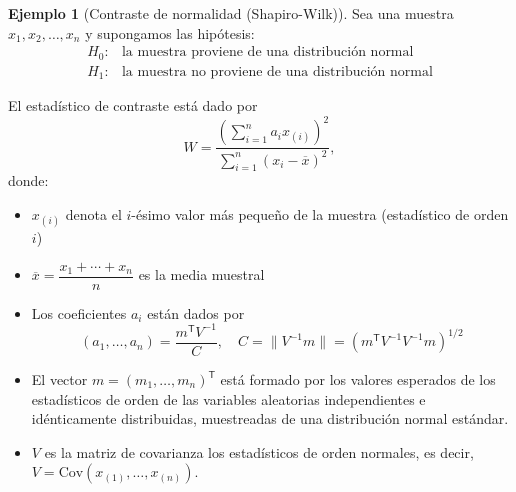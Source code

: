 \documentclass[11pt,a4paper]{book}
\theoremstyle{definition}%
\newtheorem{ejemplo}[teorema]{Ejemplo}
\begin{document}
            \begin{ejemplo}[Contraste de normalidad (Shapiro-Wilk)]
                Sea una muestra \(x_{1}, x_{2}, \ldots, x_{n}\) y supongamos las hipótesis:
                \[
                \begin{split}
                    H_{0}: &\text{la muestra proviene de una distribución normal}\\
                    H_{1}: &\text{la muestra no proviene de una distribución normal}
                \end{split}
                \]
                
                El estadístico de contraste está dado por
                    \begin{equation*}
                        W = \frac{\left( \sum_{i=1}^{n} a_i x_{(i)} \right)^{2}}{\sum_{i=1}^{n} (x_i - \overline{x})^{2}},
                    \end{equation*}
                    donde:
                    \begin{itemize}
                        \item $x_{(i)}$  denota el $i$-ésimo valor más pequeño de la muestra (estadístico de orden $i$)
                        
                        \item $\overline{x} = \dfrac{x_{1}+\cdots+x_{n}}{n}$ es la media muestral
                        
                        \item Los coeficientes $a_i$ están dados por
                        \[
                            (a_{1},\dots,a_{n}) = \frac{m^{\mathsf{T}} V^{-1}}{C}, \quad
                            C = \| V^{-1} m \| = \left( m^{\mathsf{T}} V^{-1} V^{-1} m \right)^{1/2}
                        \]
                        
                        \item El vector $m = (m_{1},\dots,m_{n})^{\mathsf{T}}$ está formado por los valores esperados de los estadísticos de orden 
                        de las variables aleatorias independientes e idénticamente distribuidas, muestreadas de una distribución normal estándar.
                        
                        \item $V$ es la matriz de covarianza los estadísticos de orden normales, es decir, $V=\text{Cov}\left(x_{(1)},\dots,x_{(n)}\right)$.
                    \end{itemize}
            \end{ejemplo}
\end{document}
